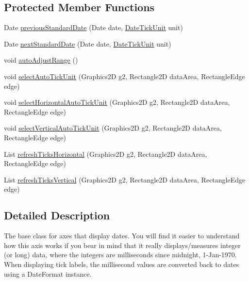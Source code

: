 \subsection*{Protected Member Functions}
\begin{DoxyCompactItemize}
\item 
Date \mbox{\hyperlink{classorg_1_1jfree_1_1chart_1_1axis_1_1_date_axis_a9fae9c0fedabdcc358f0139650b08e88}{previous\+Standard\+Date}} (Date date, \mbox{\hyperlink{classorg_1_1jfree_1_1chart_1_1axis_1_1_date_tick_unit}{Date\+Tick\+Unit}} unit)
\item 
Date \mbox{\hyperlink{classorg_1_1jfree_1_1chart_1_1axis_1_1_date_axis_ad9a46c732ca58b1dad5625a0dc6c3963}{next\+Standard\+Date}} (Date date, \mbox{\hyperlink{classorg_1_1jfree_1_1chart_1_1axis_1_1_date_tick_unit}{Date\+Tick\+Unit}} unit)
\item 
void \mbox{\hyperlink{classorg_1_1jfree_1_1chart_1_1axis_1_1_date_axis_ac538e7fe537aeb6287f5da29b7fedfb4}{auto\+Adjust\+Range}} ()
\item 
void \mbox{\hyperlink{classorg_1_1jfree_1_1chart_1_1axis_1_1_date_axis_af59526e3cdcd647ccdccad30f1872ba1}{select\+Auto\+Tick\+Unit}} (Graphics2D g2, Rectangle2D data\+Area, Rectangle\+Edge edge)
\item 
void \mbox{\hyperlink{classorg_1_1jfree_1_1chart_1_1axis_1_1_date_axis_a6a6ce9ebe5a90bbad5038903165ca070}{select\+Horizontal\+Auto\+Tick\+Unit}} (Graphics2D g2, Rectangle2D data\+Area, Rectangle\+Edge edge)
\item 
void \mbox{\hyperlink{classorg_1_1jfree_1_1chart_1_1axis_1_1_date_axis_a9b2f75e9fdb03c867c3c14b44bbae84c}{select\+Vertical\+Auto\+Tick\+Unit}} (Graphics2D g2, Rectangle2D data\+Area, Rectangle\+Edge edge)
\item 
List \mbox{\hyperlink{classorg_1_1jfree_1_1chart_1_1axis_1_1_date_axis_af3aba263ff1cb705a2723b12b39beb06}{refresh\+Ticks\+Horizontal}} (Graphics2D g2, Rectangle2D data\+Area, Rectangle\+Edge edge)
\item 
List \mbox{\hyperlink{classorg_1_1jfree_1_1chart_1_1axis_1_1_date_axis_a873358164ba3b4dc1ec0185592259a39}{refresh\+Ticks\+Vertical}} (Graphics2D g2, Rectangle2D data\+Area, Rectangle\+Edge edge)
\end{DoxyCompactItemize}


\subsection{Detailed Description}
The base class for axes that display dates. You will find it easier to understand how this axis works if you bear in mind that it really displays/measures integer (or long) data, where the integers are milliseconds since midnight, 1-\/\+Jan-\/1970. When displaying tick labels, the millisecond values are converted back to dates using a {\ttfamily Date\+Format} instance. 

